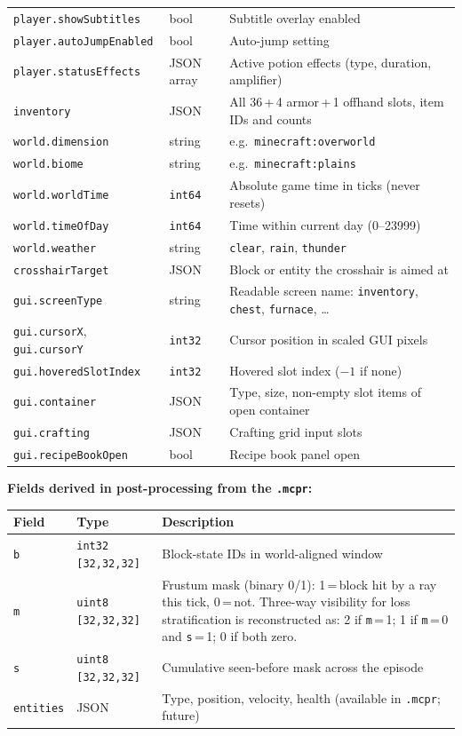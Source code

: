 \documentclass[11pt,a4paper]{article}
\begin{document}
\begin{center}
\begin{tabular}{lll}
\texttt{player.showSubtitles} & bool & Subtitle overlay enabled \\
\texttt{player.autoJumpEnabled} & bool & Auto-jump setting \\
\texttt{player.statusEffects} & JSON array & Active potion effects (type, duration, amplifier) \\
\texttt{inventory} & JSON & All 36\,+\,4 armor\,+\,1 offhand slots, item IDs and counts \\
\texttt{world.dimension} & string & e.g.\ \texttt{minecraft:overworld} \\
\texttt{world.biome} & string & e.g.\ \texttt{minecraft:plains} \\
\texttt{world.worldTime} & \texttt{int64} & Absolute game time in ticks (never resets) \\
\texttt{world.timeOfDay} & \texttt{int64} & Time within current day (0--23999) \\
\texttt{world.weather} & string & \texttt{clear}, \texttt{rain}, \texttt{thunder} \\
\texttt{crosshairTarget} & JSON & Block or entity the crosshair is aimed at \\
\texttt{gui.screenType} & string & Readable screen name: \texttt{inventory}, \texttt{chest}, \texttt{furnace}, \ldots \\
\texttt{gui.cursorX}, \texttt{gui.cursorY} & \texttt{int32} & Cursor position in scaled GUI pixels \\
\texttt{gui.hoveredSlotIndex} & \texttt{int32} & Hovered slot index ($-1$ if none) \\
\texttt{gui.container} & JSON & Type, size, non-empty slot items of open container \\
\texttt{gui.crafting} & JSON & Crafting grid input slots \\
\texttt{gui.recipeBookOpen} & bool & Recipe book panel open \\
\bottomrule
\end{tabular}
\end{center}

\textbf{Fields derived in post-processing from the \texttt{.mcpr}:}

\begin{center}
\begin{tabular}{lll}
\toprule
Field & Type & Description \\
\midrule
\texttt{b} & \texttt{int32 [32,32,32]} & Block-state IDs in world-aligned window \\
\texttt{m} & \texttt{uint8 [32,32,32]} & Frustum mask (binary 0/1): 1\,=\,block hit by a ray this tick, 0\,=\,not. Three-way visibility for loss stratification is reconstructed as: 2 if \texttt{m}\,=\,1; 1 if \texttt{m}\,=\,0 and \texttt{s}\,=\,1; 0 if both zero. \\
\texttt{s} & \texttt{uint8 [32,32,32]} & Cumulative seen-before mask across the episode \\
\texttt{entities} & JSON & Type, position, velocity, health (available in \texttt{.mcpr}; future) \\
\bottomrule
\end{tabular}
\end{center}
\end{document}
